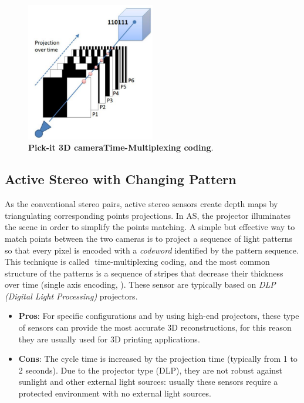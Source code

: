 \begin{figure}
    \centering
    \includegraphics[width=0.5\textwidth]{figures/1_perception_and_sensing_in_robotics/time_multiplexing_coding}
    \caption{\textbf{Pick-it 3D cameraTime-Multiplexing coding}.} 
    \label{fig:time_multiplexing_coding}
\end{figure}

\subsection{Active Stereo with Changing Pattern}\label{subsec:ac_stereo_changing_pattern}
As the conventional stereo pairs, active stereo sensors create depth maps by triangulating corresponding points projections. In AS, the projector illuminates the scene in order to simplify the points matching. A simple but effective way to match points between the two cameras is to project a sequence of light patterns so that every pixel is encoded with a \emph{codeword} identified by the pattern sequence. This technique is called ​ time-multiplexing coding, and the most common structure of the patterns is a sequence of stripes that decrease their thickness over time (single axis encoding, ). These sensor are typically based on \emph{DLP (Digital Light Processing)} projectors.

\begin{itemize}
	\item \textbf{Pros}: For specific configurations and by using high-end projectors, these type of sensors can provide the most accurate 3D reconstructions, for this reason they are usually used for 3D printing applications.
	\item \textbf{Cons}: The cycle time is increased by the projection time (typically from 1 to 2 seconds). Due to the projector type (DLP), they are not robust against sunlight and other external light sources: usually these sensors require a protected environment with no external light sources.
\end{itemize}

